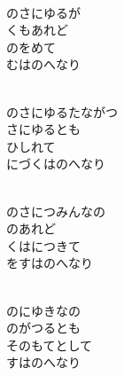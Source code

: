 \documentclass[10pt,b5j]{tarticle} %
\begin{document}
\vspace{1.5em} %
\newcommand{\linespace}{0.5em} %
\newcommand{\blocksize}{0.5\hsize} %
\newcommand{\itemmargin}{6em} %
\begin{enumerate} %
    \setlength{\itemindent}{\itemmargin} %
    \begin{minipage}[c]{\blocksize}
    
        \vspace{\linespace}
        \item~\\
        のさにゆるが\\
        くもあれど\\
        のをめて\\
        むはのへなり
        
        \vspace{\linespace}
        \item~\\
        のさにゆるたながつ\\
        さにゆるとも\\
        ひしれて\\
        にづくはのへなり
        
        \vspace{\linespace}
        \item~\\
        のさにつみんなの\\
        のあれど\\
        くはにつきて\\
        をすはのへなり
        
        \vspace{\linespace}
        \item~\\
        のにゆきなの\\
        のがつるとも\\
        そのもてとして\\
        すはのへなり
    
    \end{minipage}
\end{enumerate} %
\end{document}
